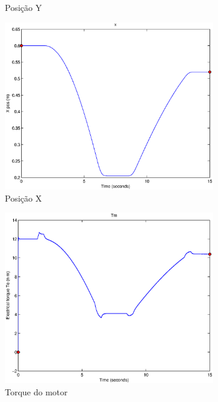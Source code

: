 \documentclass{article}
\begin{document}
\begin{figure}[H]
\begin{subfigure}{0.32\textwidth}
		\caption{Posição Y}
	\end{subfigure}
	\begin{subfigure}{0.32\textwidth}
		\includegraphics[width=\linewidth]{matlab/x5}
		\caption{Posição X}
	\end{subfigure}
	\begin{subfigure}{0.32\textwidth}
		\includegraphics[width=\linewidth]{matlab/tm5}
		\caption{Torque do motor}
	\end{subfigure}
	\begin{subfigure}{0.32\textwidth}

\end{subfigure}
\end{figure}
\end{document}

